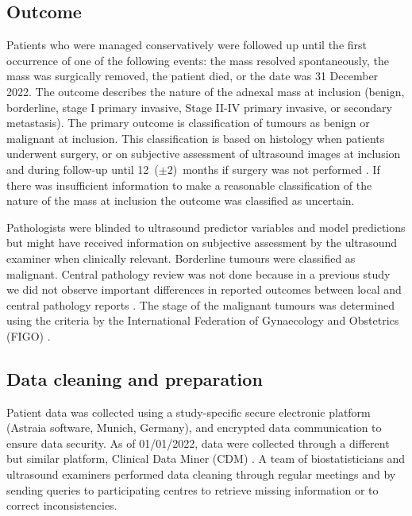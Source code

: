 \subsection{Outcome}

Patients who were managed conservatively were followed up until the first occurrence of one of the following events: the mass resolved spontaneously, the mass was surgically removed, the patient died, or the date was 31 December 2022. The outcome describes the nature of the adnexal mass at inclusion (benign, borderline, stage I primary invasive, Stage II-IV primary invasive, or secondary metastasis). The primary outcome is classification of tumours as benign or malignant at inclusion. This classification is based on histology when patients underwent surgery, or on subjective assessment of ultrasound images at inclusion and during follow-up until 12~($\pm 2$)~months if surgery was not performed \cite{vancalsterValidationModelsDiagnose2020}. If there was insufficient information to make a reasonable classification of the nature of the mass at inclusion the outcome was classified as uncertain.

Pathologists were blinded to ultrasound predictor variables and model predictions but might have received information on subjective assessment by the ultrasound examiner when clinically relevant. Borderline tumours were classified as malignant. Central pathology review was not done because in a previous study we did not observe important differences in reported outcomes between local and central pathology reports \cite{timmermanLogisticRegressionModel2005}. The stage of the malignant tumours was determined using the criteria by the International Federation of Gynaecology and Obstetrics (FIGO) \cite{heintzCarcinomaOvary2003}.

\subsection{Data cleaning and preparation}

Patient data was collected using a study-specific secure electronic platform (Astraia software, Munich, Germany), and encrypted data communication to ensure data security. As of 01/01/2022, data were collected through a different but similar platform, Clinical Data Miner (CDM) \cite{installeClinicalDataMiner2014}. A team of biostatisticians and ultrasound examiners performed data cleaning through regular meetings and by sending queries to participating centres to retrieve missing information or to correct inconsistencies.

